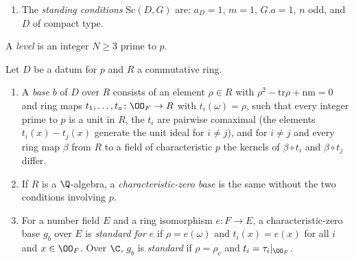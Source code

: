 \begin{definition}
\begin{enumerate}
  fields, sets $n_G=n_D$, realizes $C$ as the centralizer of $O$ in $\End_\Q(\Lambda\otimes\Q)$
  compatibly with the involutions, and matches the archimedean and $p$-adic data. Through $L$ the
  group $\kstwoG$ acts on $\A_f^p\otimes\Lambda$ (we write $h\cdot v$); put
  $\kstwoLaHat=\hat\Z^p\otimes\Lambda$. An element $h$ is \emph{integral} if $h\cdot\kstwoLaHat\subseteq\kstwoLaHat$. For
  $N\ge1$, $K_N\subseteq\kstwoG$ is the group of $g$ such
  that $g$ and $g^{-1}$ act trivially on $\kstwoLaHat/N\kstwoLaHat$. For $h\in\kstwoG$ and levels
  $N',N$, $h$ is \emph{admissible from $N'$ to $N$} if $hK_{N'}h^{-1}\subseteq K_N$.
\item The \emph{standing conditions} $\mathrm{Sc}(D,G)$ are:
  $a_D=1$, $m=1$, $G.a=1$, $n$ odd, and $D$ of compact type.
\end{enumerate}
A \emph{level} is an integer $N\ge3$ prime to $p$.
\end{definition}

\begin{definition}[Bases]\label{pf:ks2:def:base}
Let $D$ be a datum for $p$ and $R$ a commutative ring.
\begin{enumerate}
\item A \emph{base} $b$ of $D$ over $R$ consists of an
  element $\rho\in R$ with $\rho^2-\mathrm{tr}\rho+\mathrm{nm}=0$ and ring maps
  $t_1,\dots,t_a\colon\kstwoOF\to R$ with $t_i(\omega)=\rho$, such that every integer prime to
  $p$ is a unit in $R$, the $t_i$ are pairwise comaximal (the elements $t_i(x)-t_j(x)$ generate
  the unit ideal for $i\ne j$), and for $i\neq j$ and every ring map $\beta$ from $R$ to a field of
  characteristic $p$ the kernels of $\beta\circ t_i$ and $\beta\circ t_j$ differ.
\item If $R$ is a $\Q$-algebra, a \emph{characteristic-zero base} is the same without the two conditions involving $p$.
\item For a number field $E$ and a ring isomorphism $e\colon F\to E$, a characteristic-zero base
  $g_b$ over $E$ is \emph{standard for $e$} if
  $\rho=e(\omega)$ and $t_i(x)=e(x)$ for all $i$ and $x\in\kstwoOF$. Over $\C$, $g_b$ is
  \emph{standard} if $\rho=\rho_c$ and
  $t_i=\tau_i|_{\kstwoOF}$.
\end{enumerate}
\end{definition}

